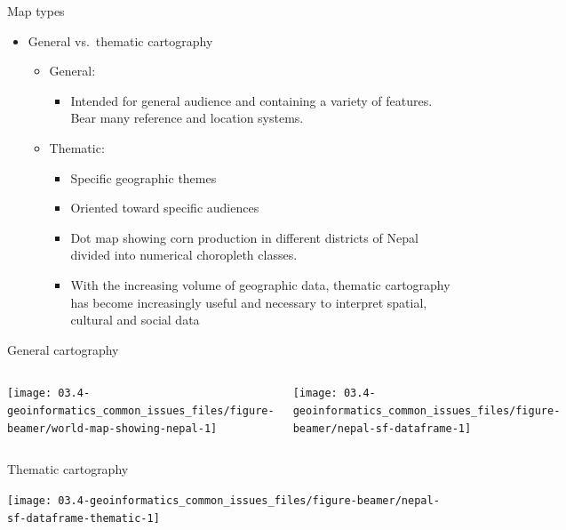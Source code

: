 \documentclass[11pt,dvipsnames,ignorenonframetext,aspectratio=169]{beamer}
\providecommand{\tightlist}{%
  \setlength{\itemsep}{0pt}\setlength{\parskip}{0pt}}
\begin{document}
\begin{frame}{Map types}
\protect\hypertarget{map-types}{}
\begin{itemize}
\tightlist
\item
  General vs.~thematic cartography

  \begin{itemize}
  \tightlist
  \item
    General:

    \begin{itemize}
    \tightlist
    \item
      Intended for general audience and containing a variety of
      features. Bear many reference and location systems.
    \end{itemize}
  \item
    Thematic:

    \begin{itemize}
    \tightlist
    \item
      Specific geographic themes
    \item
      Oriented toward specific audiences
    \item
      Dot map showing corn production in different districts of Nepal
      divided into numerical choropleth classes.
    \item
      With the increasing volume of geographic data, thematic
      cartography has become increasingly useful and necessary to
      interpret spatial, cultural and social data
    \end{itemize}
  \end{itemize}
\end{itemize}
\end{frame}

\begin{frame}{General cartography}
\protect\hypertarget{general-cartography}{}
\begin{columns}[T, onlytextwidth]


\texttt{[image: 03.4-geoinformatics\_common\_issues\_files/figure-beamer/world-map-showing-nepal-1]} 



\texttt{[image: 03.4-geoinformatics\_common\_issues\_files/figure-beamer/nepal-sf-dataframe-1]} 

\end{columns}
\end{frame}

\begin{frame}{Thematic cartography}
\protect\hypertarget{thematic-cartography}{}
\begin{center}\texttt{[image: 03.4-geoinformatics\_common\_issues\_files/figure-beamer/nepal-sf-dataframe-thematic-1]} \end{center}
\end{frame}
\end{document}
